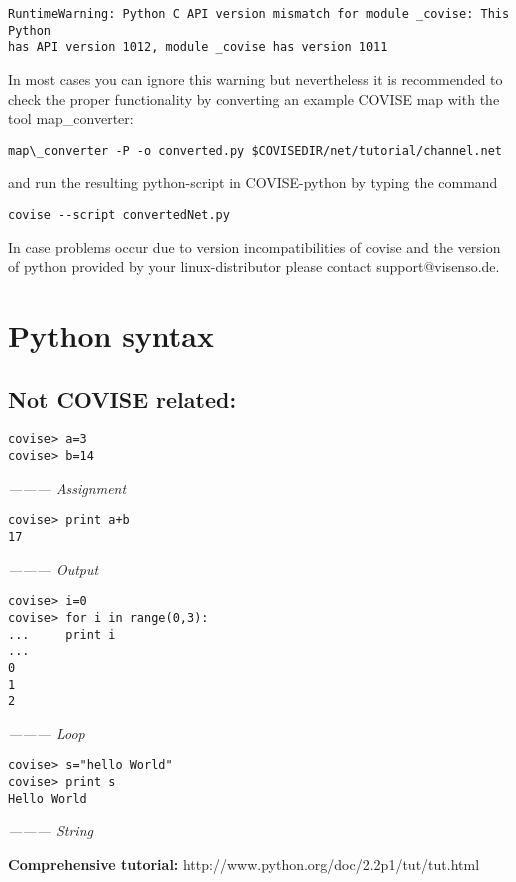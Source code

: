 \begin{verbatim}
RuntimeWarning: Python C API version mismatch for module _covise: This Python 
has API version 1012, module _covise has version 1011
\end{verbatim}


In most cases you can ignore this warning but nevertheless it is recommended to 
check the proper functionality by converting an example COVISE map with the 
tool map\_converter:

\begin{verbatim}map\_converter -P -o converted.py $COVISEDIR/net/tutorial/channel.net\end{verbatim} 

and run the resulting python-script  in COVISE-python by typing 
the command
 
\begin{verbatim}covise --script convertedNet.py\end{verbatim}
 
In case problems occur due to 
version incompatibilities of covise and the version of python provided by 
your linux-distributor please contact support@visenso.de.  

\clearpage

\section{Python syntax}

\subsection{Not COVISE related:}

\begin{verbatim}
covise> a=3                        
covise> b=14
\end{verbatim}
	{\it --------- Assignment}
\begin{verbatim}
covise> print a+b		
17
\end{verbatim}
	{\it --------- Output}
\begin{verbatim}
covise> i=0
covise> for i in range(0,3):      
...     print i
...
0
1
2
\end{verbatim}
	{\it --------- Loop}
\begin{verbatim}
covise> s="hello World"		
covise> print s
Hello World
\end{verbatim}
	{\it --------- String}


\vspace{0.5cm}
{\bf Comprehensive tutorial:}\newline
	http://www.python.org/doc/2.2p1/tut/tut.html


